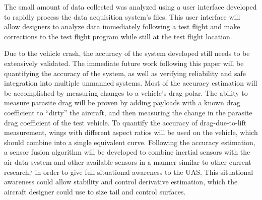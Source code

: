 The small amount of data collected was analyzed using a user interface developed to rapidly process the data acquisition system's files. This user interface will allow designers to analyze data immediately following a test flight and make corrections to the test flight program while still at the test flight location.
 
 Due to the vehicle crash, the accuracy of the system developed still needs to be extensively validated. The immediate future work following this paper will be quantifying the accuracy of the system, as well as verifying reliability and safe integration into multiple unmanned systems. Most of the accuracy estimation will be accomplished by measuring changes to a vehicle's drag polar. The ability to measure parasite drag will be proven by adding payloads with a known drag coefficient to ``dirty'' the aircraft, and then measuring the change in the parasite drag coefficient of the test vehicle. To quantify the accuracy of drag-due-to-lift measurement, wings with different aspect ratios will be used on the vehicle, which should combine into a single equivalent curve\cite{prandtl1923applications}. Following the accuracy estimation, a sensor fusion algorithm will be developed to combine inertial sensors with the air data system and other available sensors in a manner similar to other current research,\cite{wvINSAirData}$^,$\cite{gtUKF} in order to give full situational awareness to the UAS. This situational awareness could allow stability and control derivative estimation, which the aircraft designer could use to size tail and control surfaces.